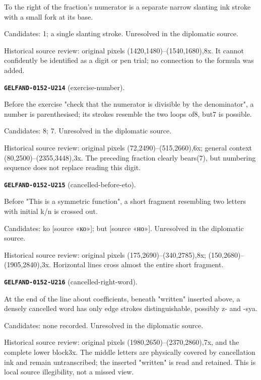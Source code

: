 To the right of the fraction's numerator is a separate narrow slanting ink stroke with a small fork at its base.\par
Candidates: 1; a single slanting stroke. Unresolved in the diplomatic source.\par
Historical source review: original pixels (1420,1480)–(1540,1680),8x. It cannot confidently be identified as a digit or pen trial; no connection to the formula was added.\par\medskip
\par\noindent\leavevmode{}\label{GELFAND-0152-U214}\textbf{\texttt{GELFAND-0152-U214}} (exercise-number).\nopagebreak[4]\par
Before the exercise "check that the numerator is divisible by the denominator", a number is parenthesised; its strokes resemble the two loops of8, but7 is possible.\par
Candidates: 8; 7. Unresolved in the diplomatic source.\par
Historical source review: original pixels (72,2490)–(515,2660),6x; general context (80,2500)–(2355,3448),3x. The preceding fraction clearly bears(7), but numbering sequence does not replace reading this digit.\par\medskip
\par\noindent\leavevmode{}\label{GELFAND-0152-U215}\textbf{\texttt{GELFAND-0152-U215}} (cancelled-before-eto).\nopagebreak[4]\par
Before "This is a symmetric function", a short fragment resembling two letters with initial k/n is crossed out.\par
Candidates: ko [source «ко»]; but [source «но»]. Unresolved in the diplomatic source.\par
Historical source review: original pixels (175,2690)–(340,2785),8x; (150,2680)–(1905,2840),3x. Horizontal lines cross almost the entire short fragment.\par\medskip
\par\noindent\leavevmode{}\label{GELFAND-0152-U216}\textbf{\texttt{GELFAND-0152-U216}} (cancelled-right-word).\nopagebreak[4]\par
At the end of the line about coefficients, beneath "written" inserted above, a densely cancelled word has only edge strokes distinguishable, possibly z- and -sya.\par
Candidates: none recorded. Unresolved in the diplomatic source.\par
Historical source review: original pixels (1980,2650)–(2370,2860),7x, and the complete lower block3x. The middle letters are physically covered by cancellation ink and remain untranscribed; the inserted "written" is read and retained. This is local source illegibility, not a missed view.\par\medskip

